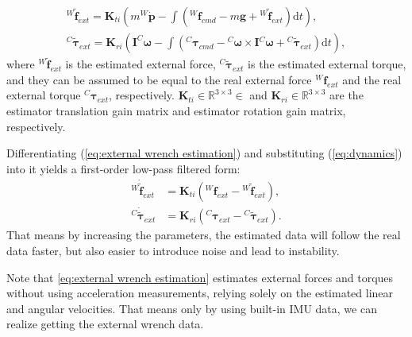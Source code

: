 \begin{subequations}
\label{eq:external wrench estimation}
\begin{align}
 {^W\!\boldsymbol{\tilde{f}}_{ext}}=\boldsymbol{K}_{ti}(m^W\!\dot{\boldsymbol{p}}-\int({^W\!\boldsymbol{f}_{cmd}}-m\boldsymbol{g}+ {^W\!\boldsymbol{\tilde{f}}_{ext}})\mathrm{d}t),\\
 {^C\!\boldsymbol{\tilde{\tau}}_{ext}}=\boldsymbol{K}_{ri}(\boldsymbol{I}^C\!\boldsymbol{\omega}-\int({^C\!\boldsymbol{\tau}_{cmd}}-{^C\!\boldsymbol{\omega}} \times \boldsymbol{I}{^C\!\boldsymbol{\omega}} + {^C\!\boldsymbol{\tilde{\tau}}_{ext}})\mathrm{d}t),
\end{align}
\end{subequations}
where ${^W\!\boldsymbol{\tilde{f}}_{ext}}$ is the estimated external force, ${^C\!\boldsymbol{\tilde{\tau}}_{ext}}$ is the estimated external torque, and they can be assumed to be equal to the real external force ${^W\!\boldsymbol{f}}_{ext}$ and the real external torque   ${^C\!\boldsymbol{\tau}_{ext}}$, respectively. $\boldsymbol{K}_{ti} \in \mathbb{R}^{3\times3} \in $ and $\boldsymbol{K}_{ri} \in \mathbb{R}^{3\times3}$ are the estimator translation gain matrix and estimator rotation gain matrix, respectively.

Differentiating (\ref{eq:external wrench estimation}) and substituting (\ref{eq:dynamics}) into it yields a first-order low-pass filtered form: 
\begin{subequations}
\label{eq:external wrench estimation low-pass}
\begin{align}
 {^W\!\boldsymbol{\dot{\tilde{f}}}_{ext}}&=\boldsymbol{K}_{ti}({^W\!\boldsymbol{f}}_{ext}-{^W\!\boldsymbol{\tilde{f}}_{ext}}),\\
 {^C\!\boldsymbol{\dot{\tilde{\tau}}}_{ext}}&=\boldsymbol{K}_{ri}({^C\!\boldsymbol{\tau}_{ext}}-{^C\!\boldsymbol{\tilde{\tau}}_{ext}}).
\end{align}
\end{subequations}
That means by increasing the parameters, the estimated data will follow the real data faster, but also easier to introduce noise and lead to instability.

Note that \eqref{eq:external wrench estimation} estimates external forces and torques without using acceleration measurements, relying solely on the estimated linear and angular velocities. That means only by using built-in IMU data, we can realize getting the external wrench data.


